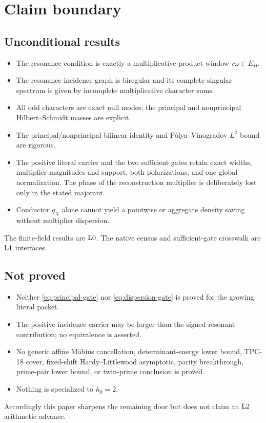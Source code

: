 \section{Claim boundary}
\label{sec:claim-boundary}

\subsection*{Unconditional results}

\begin{itemize}[leftmargin=2em]
\item The resonance condition is exactly a multiplicative product
  window \(r\omega\in E_H\).
\item The resonance incidence graph is biregular and its complete
  singular spectrum is given by incomplete multiplicative character
  sums.
\item All odd characters are exact null modes; the principal and
  nonprincipal Hilbert--Schmidt masses are explicit.
\item The principal/nonprincipal bilinear identity and
  P\'olya--Vinogradov \(L^2\) bound are rigorous.
\item The positive literal carrier and the two sufficient gates
  retain exact widths, multiplier magnitudes and support, both
  polarizations, and one global normalization.  The phase of the
  reconstruction multiplier is deliberately lost only in the
  stated majorant.
\item Conductor \(q_X\) alone cannot yield a pointwise or aggregate
  density saving without multiplier dispersion.
\end{itemize}

The finite-field results are \(\mathrm{L0}\).  The native census and
sufficient-gate crosswalk are \(\mathrm{L1}\) interfaces.

\subsection*{Not proved}

\begin{itemize}[leftmargin=2em]
\item Neither \eqref{eq:principal-gate} nor
  \eqref{eq:dispersion-gate} is proved for the growing literal
  packet.
\item The positive incidence carrier may be larger than the signed
  resonant contribution; no equivalence is asserted.
\item No generic affine M\"obius cancellation, determinant-energy
  lower bound, TPC-18 cover, fixed-shift Hardy--Littlewood
  asymptotic, parity breakthrough, prime-pair lower bound, or
  twin-prime conclusion is proved.
\item Nothing is specialized to \(h_0=2\).
\end{itemize}

Accordingly this paper sharpens the remaining door but does not
claim an \(\mathrm{L2}\) arithmetic advance.

